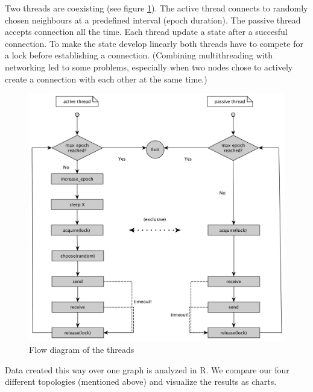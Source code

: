 \documentclass[11pt,a4paper]{article}
\begin{document}
Two threads are coexisting (see figure \ref{fig:flow_diag}). The active thread connects to randomly chosen neighbours at a predefined interval (epoch duration). The passive thread accepts connection all the time. Each thread update a state after a succesful connection. To make the state develop linearly both threads have to compete for a lock before establishing a connection. (Combining multithreading with networking led to some problems, especially when two nodes chose to actively create a connection with each other at the same time.)
\begin{figure}[h!]
    \begin{center}
        \includegraphics[scale=0.25]{flow_diag.jpg}
    \end{center}
    \caption{Flow diagram of the threads}
    \label{fig:flow_diag}
\end{figure}

Data created this way over one graph is analyzed in R. We compare our four different topologies (mentioned above) and visualize the results as charts.
\end{document}
